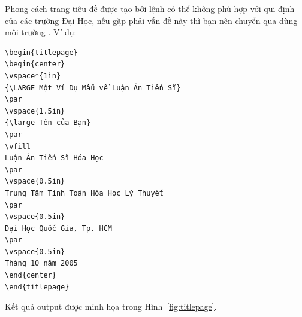 \documentclass[a4paper]{report}
\begin{document}
Phong cách trang tiêu đề được tạo bởi lệnh  có thể không phù hợp với qui định của các trường Đại Học, nếu gặp phải vấn đề này  thì bạn nên chuyển qua dùng môi trường . Ví dụ:
\begin{verbatim}
\begin{titlepage}
\begin{center}
\vspace*{1in}
{\LARGE Một Ví Dụ Mẫu về Luận Án Tiến Sĩ}
\par
\vspace{1.5in}
{\large Tên của Bạn}
\par
\vfill
Luận Án Tiến Sĩ Hóa Học
\par
\vspace{0.5in}
Trung Tâm Tính Toán Hóa Học Lý Thuyết
\par
\vspace{0.5in}
Đại Học Quốc Gia, Tp. HCM
\par
\vspace{0.5in}
Tháng 10 năm 2005
\end{center}
\end{titlepage}
\end{verbatim}

Kết quả output được minh họa trong Hình~\ref{fig:titlepage}.

\renewcommand{\scalefac}{0.8}
\renewcommand{\anglerot}{0}

\latex{\ifscreen\renewcommand{\scalefac}{0.5}\renewcommand{\anglerot}{90}\fi}
\end{document}
